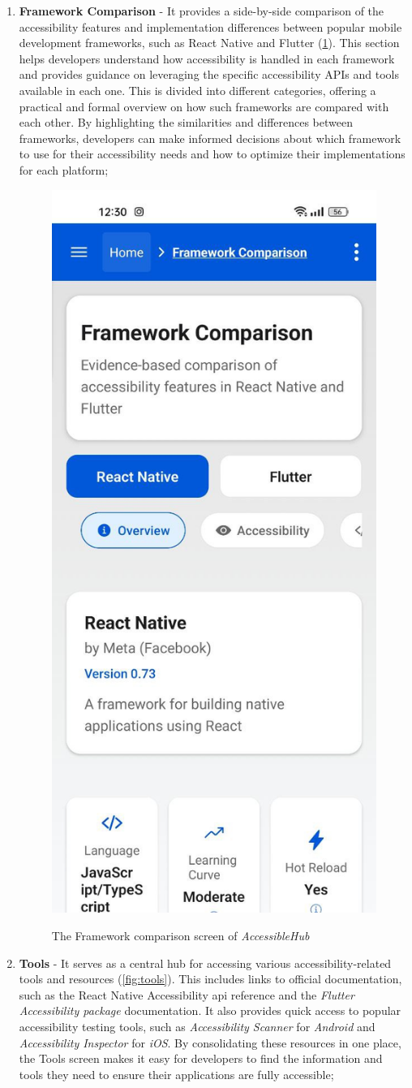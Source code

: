 \begin{enumerate}
\pagebreak

\item \textbf{Framework Comparison} - It provides a side-by-side comparison of the accessibility features and implementation differences between popular mobile development frameworks, such as React Native and Flutter (\ref{fig:frameworks-comparison}). This section helps developers understand how accessibility is handled in each framework and provides guidance on leveraging the specific accessibility APIs and tools available in each one. This is divided into different categories, offering a practical and formal overview on how such frameworks are compared with each other. By highlighting the similarities and differences between frameworks, developers can make informed decisions about which framework to use for their accessibility needs and how to optimize their implementations for each platform;

\begin{figure}[ht]
\centering
\includegraphics[width=0.4\linewidth, alt={Screenshot of the Framework comparison screen of AccessibleHub}]{img/frameworks-comparison.jpg}
\caption{The Framework comparison screen of \textit{AccessibleHub}}\label{fig:frameworks-comparison}
\end{figure}

\pagebreak

\item \textbf{Tools} - It serves as a central hub for accessing various accessibility-related tools and resources (\ref{fig:tools}). This includes links to official documentation, such as the React Native Accessibility \acrshort{api} reference and the \textit{Flutter Accessibility package} documentation. It also provides quick access to popular accessibility testing tools, such as \textit{Accessibility Scanner} for \textit{Android} and \textit{Accessibility Inspector} for \textit{iOS}. By consolidating these resources in one place, the Tools screen makes it easy for developers to find the information and tools they need to ensure their applications are fully accessible; 


\end{enumerate}
